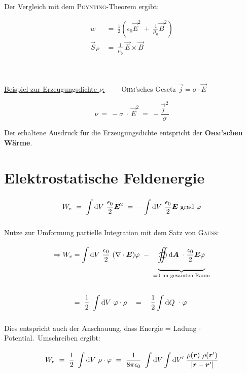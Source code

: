 \newpage
Der Vergleich mit dem \textsc{Poynting}-Theorem ergibt:

\begin{align*}
w \ &= \ \frac{1}{2} \left(\epsilon_0\vec{E}^2 \ + \ \frac{1}{\mu_0}\vec{B}^2\right)\\
\vec{S}_P \ &= \ \frac{1}{\mu_0} \ \vec{E}\times\vec{B} 
\end{align*}

\ \\
\ \\
\underline{Beispiel zur Erzeugungsdichte $\nu$:}$\qquad$ \textsc{Ohm}'sches Gesetz $\vec{j} = \sigma \cdot \vec{E}$

\begin{equation*}
\nu \ = \ - \sigma \ \cdot \ \vec{E}^2 \ = \ - \frac{\vec{j}^2}{\sigma}
\end{equation*}

Der erhaltene Ausdruck für die Erzeugungsdichte entspricht der \textbf{\textsc{Ohm}'schen Wärme}.

\section{Elektrostatische Feldenergie}

\begin{equation*}
W_e \ = \ \int\limits_{{}}^{{}}\mathrm{d}{V}\  \frac{\epsilon_0}{2} \bm{E}^2 \ = \ - \int\limits_{{}}^{{}}\mathrm{d}{V}\  \frac{\epsilon_0}{2} \bm{E} \ \text{grad }\varphi
\end{equation*}

Nutze zur Umformung partielle Integration mit dem Satz von \textsc{Gauss}:

\begin{align*}
\Rightarrow W_e &= \int\limits_{{}}^{{}}\mathrm{d}{V}\  \frac{\epsilon_0}{2} \ (\nabla \cdot \bm{E}) \varphi \ - \ \underbrace{\oiint\limits_{{}}^{{}}\mathrm{d}{\bm{A}}\  \cdot \frac{\epsilon_0}{2}\bm{E}\varphi}_{=0 \text{ im gesamten Raum}} \\
\\
&= \ \frac{1}{2} \ \int\limits_{{}}^{{}}\mathrm{d}{V}\  \varphi \cdot \rho \quad = \quad \frac{1}{2} \int\limits_{{}}^{{}}\mathrm{d}{Q}\  \cdot \varphi
\end{align*}

Dies entspricht auch der Anschauung, dass Energie = Ladung $\cdot$ Potential.\
Umschreiben ergibt:

\begin{equation*}
W_e \ = \ \frac{1}{2} \ \int\limits_{{}}^{{}}\mathrm{d}{V}\  \rho \cdot \varphi \ = \ \frac{1}{8\pi\epsilon_0} \ \int\mathrm{d} V\int\mathrm{d} V' \; \frac{\rho(\bm{r}) \ \rho(\bm{r}')}{|\bm{r}-\bm{r}'|}
\end{equation*}


